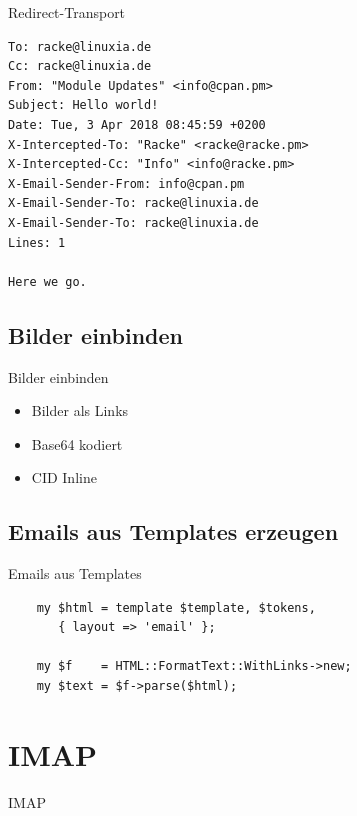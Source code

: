 \begin{frame}[fragile]{Redirect-Transport}
\begin{lstlisting}
To: racke@linuxia.de
Cc: racke@linuxia.de
From: "Module Updates" <info@cpan.pm>
Subject: Hello world!
Date: Tue, 3 Apr 2018 08:45:59 +0200
X-Intercepted-To: "Racke" <racke@racke.pm>
X-Intercepted-Cc: "Info" <info@racke.pm>
X-Email-Sender-From: info@cpan.pm
X-Email-Sender-To: racke@linuxia.de
X-Email-Sender-To: racke@linuxia.de
Lines: 1

Here we go.
\end{lstlisting}
\end{frame}

\subsection{Bilder einbinden}

\begin{frame}{Bilder einbinden}
  \begin{itemize}
  \item Bilder als Links
  \item Base64 kodiert
  \item CID Inline
  \end{itemize}
\end{frame}


\subsection{Emails aus Templates erzeugen}

\begin{frame}[fragile]{Emails aus Templates}
  \begin{verbatim}
    my $html = template $template, $tokens,
       { layout => 'email' };

    my $f    = HTML::FormatText::WithLinks->new;
    my $text = $f->parse($html);
  \end{verbatim}
\end{frame}

\section{IMAP}

\begin{frame}{IMAP}
\end{frame}

